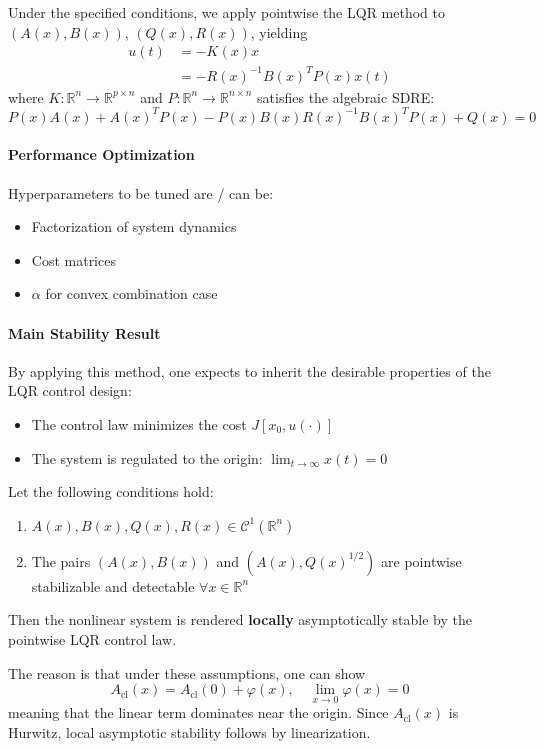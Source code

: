 \newpar{}

Under the specified conditions, we apply pointwise the LQR method to $(A(x), B(x))$, $(Q(x), R(x))$, yielding
\begin{align*}
    u(t) & = -K(x) x                         \\
         & = -{R(x)}^{-1} {B(x)}^T P(x) x(t)
\end{align*}
where $K : \mathbb{R}^n \to \mathbb{R}^{p \times n}$ and $P : \mathbb{R}^n \to \mathbb{R}^{n \times n}$ satisfies the algebraic SDRE:
{\small
\begin{equation*}
    P(x) A(x) + {A(x)}^T P(x) - P(x) B(x) {R(x)}^{-1} {B(x)}^T P(x) + Q(x) = 0
\end{equation*}
}

\paragraph{Performance Optimization}
Hyperparameters to be tuned are / can be:
\begin{itemize}
    \item Factorization of system dynamics
    \item Cost matrices
    \item $\alpha$ for convex combination case
\end{itemize}

\paragraph{Main Stability Result}
By applying this method, one expects to inherit the desirable properties of the LQR control design:
\begin{itemize}
    \item The control law minimizes the cost $J[x_0, u(\cdot)]$
    \item The system is regulated to the origin: $\lim_{t \to \infty} x(t) = 0$
\end{itemize}

\newpar{}

Let the following conditions hold:
\begin{enumerate}
    \item $A(x), B(x), Q(x), R(x) \in \mathcal{C}^1(\mathbb{R}^n)$
    \item The pairs $(A(x), B(x))$ and $(A(x), Q(x)^{1/2})$ are pointwise stabilizable and detectable $\forall x \in \mathbb{R}^n$
\end{enumerate}
\newpar{}
Then the nonlinear system is rendered \textbf{locally} asymptotically stable by the pointwise LQR control law.
\begin{examplesection}
    The reason is that under these assumptions, one can show
    \begin{equation*}
        A_{\text{cl}}(x) = A_{\text{cl}}(0) + \varphi(x), \quad \lim_{x \to 0} \varphi(x) = 0
    \end{equation*}
    meaning that the linear term dominates near the origin. Since $A_{\text{cl}}(x)$ is Hurwitz, local asymptotic stability follows by linearization.
\end{examplesection}

